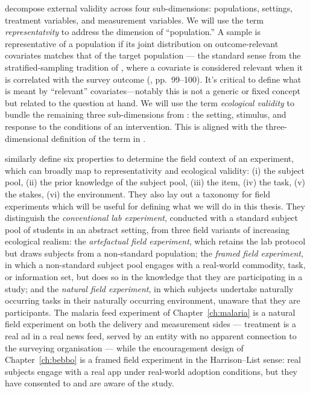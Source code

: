 \citet{CampbellStanley1963} decompose external validity across four sub-dimensions: populations, settings, treatment variables, and measurement variables. We will use the term \emph{representatvity} to address the dimension of ``population.'' A sample is representative of a population if its joint distribution on outcome-relevant covariates matches that of the target population --- the standard sense from the stratified-sampling tradition of \citet{Neyman1934}, where a covariate is considered relevant when it is correlated with the survey outcome (\citealt{Cochran1977}, pp.~99--100). It's critical to define what is meant by ``relevant'' covariates---notably this is not a generic or fixed concept but related to the question at hand. We will use the term \emph{ecological validity} to bundle the remaining three sub-dimensions from \citet{CampbellStanley1963}: the setting, stimulus, and response to the conditions of an intervention. This is aligned with the three-dimensional definition of the term in \citet{Schmuckler2001}.

\citet{Harrison2004} similarly define six properties to determine the field context of an experiment, which can broadly map to representativity and ecological validity: (i) the subject pool, (ii) the prior knowledge of the subject pool, (iii) the item, (iv) the task, (v) the stakes, (vi) the environment. They also lay out a taxonomy for field experiments which will be useful for defining what we will do in this thesis. They distinguish the \emph{conventional lab experiment}, conducted with a standard subject pool of students in an abstract setting, from three field variants of increasing ecological realism: the \emph{artefactual field experiment}, which retains the lab protocol but draws subjects from a non-standard population; the \emph{framed field experiment}, in which a non-standard subject pool engages with a real-world commodity, task, or information set, but does so in the knowledge that they are participating in a study; and the \emph{natural field experiment}, in which subjects undertake naturally occurring tasks in their naturally occurring environment, unaware that they are participants. The malaria feed experiment of Chapter~\ref{ch:malaria} is a natural field experiment on both the delivery and measurement sides --- treatment is a real ad in a real news feed, served by an entity with no apparent connection to the surveying organisation --- while the encouragement design of Chapter~\ref{ch:bebbo} is a framed field experiment in the Harrison--List sense: real subjects engage with a real app under real-world adoption conditions, but they have consented to and are aware of the study.


